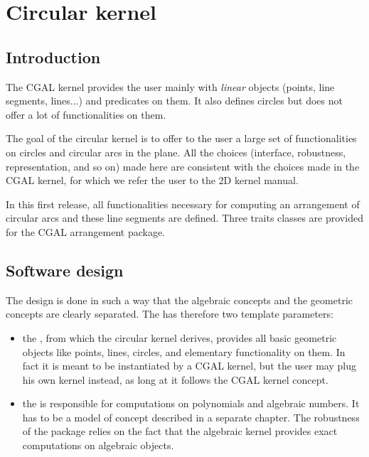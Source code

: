 \chapter{Circular kernel}
\label{chapter-circular-kernel}


\section{Introduction}

The CGAL kernel provides the user mainly with \textit{linear} objects
(points, line segments, lines...) and predicates on them. It also
defines circles but does not offer a lot of functionalities on them. 

The goal of the circular kernel is to offer to the user a large set of
functionalities on circles and circular arcs in the plane. All the
choices (interface, robustness, representation, and so on) made here
are consistent with the choices made in the CGAL kernel, for which we
refer the user to the 2D kernel manual. 

In this first release, all functionalities necessary for computing an
arrangement of circular arcs and these line segments are
defined. Three traits classes are provided for the CGAL arrangement
package. 

\section{Software design}

The design is done in such a way that the algebraic concepts and the
geometric concepts are clearly separated. The 
has therefore two template parameters: 
\begin{itemize}
\item {} the , from which the circular kernel derives,
provides all basic geometric objects like points, lines, circles, and
elementary functionality on them. In fact it is meant to be
instantiated by a CGAL kernel,  but the user may plug his own kernel
instead, as long at it follows the CGAL kernel concept. 
\item {} the  is responsible for computations on
polynomials and algebraic numbers. It has to be a model of concept 
 described in a separate chapter. The
robustness of the package relies on the fact that the algebraic kernel
provides exact computations on algebraic objects.
\end{itemize}

